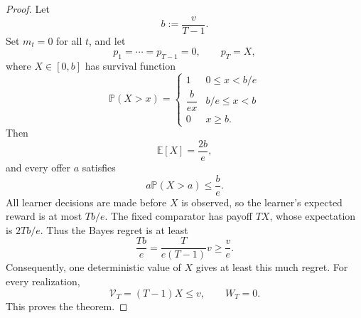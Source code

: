 \documentclass[11pt]{article}
\theoremstyle{definition}
\begin{document}
\begin{proof}
Let
\[
    b:=\frac{v}{T-1}.
\]
Set $m_t=0$ for all $t$, and let
\[
    p_1=\cdots=p_{T-1}=0,
    \qquad
    p_T=X,
\]
where $X\in[0,b]$ has survival function
\[
    \mathbb{P}(X>x)=
    \begin{cases}
        1 & 0\le x<b/e\\
        \dfrac{b}{ex} & b/e\le x<b\\
        0 & x\ge b.
    \end{cases}
\]
Then
\[
    \mathbb{E}[X]=\frac{2b}{e},
\]
and every offer $a$ satisfies
\[
    a\mathbb{P}(X>a)\le\frac{b}{e}.
\]
All learner decisions are made before $X$ is observed, so the learner's
expected reward is at most $Tb/e$. The fixed comparator has payoff
$TX$, whose expectation is $2Tb/e$. Thus the Bayes regret is at least
\[
    \frac{Tb}{e}
    =
    \frac{T}{e(T-1)}v
    \ge
    \frac{v}{e}.
\]
Consequently, one deterministic value of $X$ gives at least this much
regret. For every realization,
\[
    \mathcal{V}_T=(T-1)X\le v,
    \qquad
    W_T=0.
\]
This proves the theorem.
\end{proof}
\end{document}
